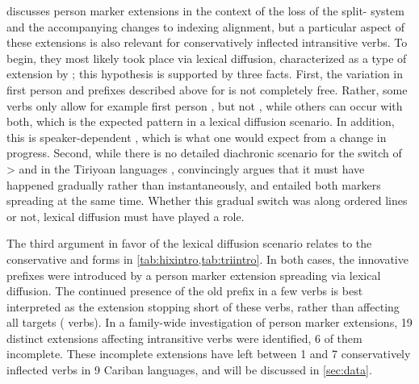 
\textcite{gildea1998} discusses person marker extensions in the context of the loss of the split- system and the accompanying changes to indexing alignment, but a particular aspect of these extensions is also relevant for conservatively inflected intransitive verbs.
To begin, they most likely took place via lexical diffusion, characterized as a type of extension by \textcite[106--115]{harris1995historical}; this hypothesis is supported by three facts.
First, the variation in first person and  prefixes described above for \kaxui is not completely free.
Rather, some verbs only allow for example first person , but not , while others can occur with both, which is the expected pattern in a lexical diffusion scenario.
In addition, this is speaker-dependent , which is what one would expect from a change in progress.
Second, while there is no detailed diachronic scenario for the switch of >  and  in the Tiriyoan languages , \textcite[111--112]{meira1998proto} convincingly argues that it must have happened gradually rather than instantaneously, and entailed both markers spreading at the same time.
Whether this gradual switch was along ordered lines or not, lexical diffusion must have played a role.

The third argument in favor of the lexical diffusion scenario relates to the conservative \hixka and \trio forms in \cref{tab:hixintro,tab:triintro}.
In both cases, the innovative  prefixes were introduced by a person marker extension spreading via lexical diffusion.
The continued presence of the old  prefix in a few verbs is best interpreted as the extension stopping short of these verbs, rather than affecting all targets ( verbs).
In a family-wide investigation of person marker extensions, 19 distinct extensions affecting intransitive verbs were identified, 6 of them incomplete.
These incomplete extensions have left between 1 and 7 conservatively inflected verbs in 9 Cariban languages, and will be discussed in \cref{sec:data}.

